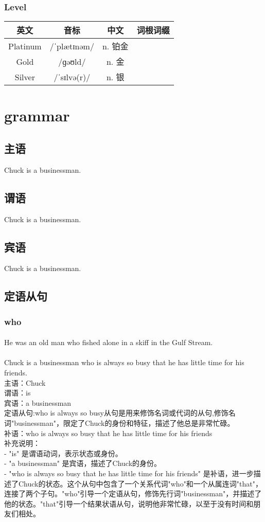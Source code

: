 \documentclass[12pt,twiside,a4paper]{ctexbook}
\numberwithin{chapter}{part}
\begin{document}
\subsection{Level}
\begin{tabular}{|c|c|c|c|}
\hline
英文 & 音标 & 中文 & 词根词缀\\
\hline
Platinum & /ˈplætɪnəm/ & n. 铂金 & \\
Gold & /ɡəʊld/ & n. 金 & \\
Silver & /ˈsɪlvə(r)/ & n. 银 & \\
\hline
\end{tabular}

\chapter{grammar}
\section{主语}
Chuck is a businessman.
\section{谓语}
Chuck is a businessman.
\section{宾语}
Chuck is a businessman.
\section{定语从句}
\subsection{who}
\subsubsection{}
He was an old man who fished alone in a skiff in the Gulf Stream. 
\subsubsection{}
Chuck is a businessman who is always so busy that he has little time for his friends. \\
主语：Chuck\\
谓语：is\\
宾语：a businessman\\
定语从句:who is always so busy从句是用来修饰名词或代词的从句,修饰名词"businessman"，限定了Chuck的身份和特征，描述了他总是非常忙碌。\\
补语：who is always so busy that he has little time for his friends\\
补充说明：\\
- "is" 是谓语动词，表示状态或身份。\\
- "a businessman" 是宾语，描述了Chuck的身份。\\
- "who is always so busy that he has little time for his friends" 是补语，进一步描述了Chuck的状态。这个从句中包含了一个关系代词"who"和一个从属连词"that"，连接了两个子句。"who"引导一个定语从句，修饰先行词"businessman"，并描述了他的状态。"that"引导一个结果状语从句，说明他非常忙碌，以至于没有时间和朋友们相处。
\end{document}
